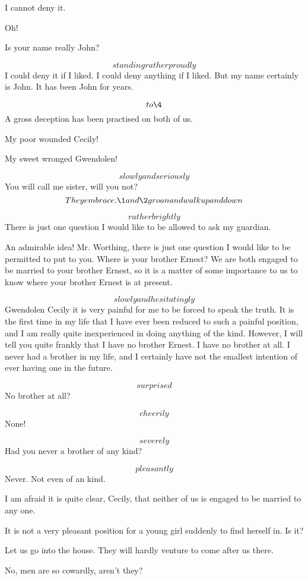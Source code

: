 \documentclass{book}
\begin{document}
\2  I cannot deny it.

\5  Oh!

\4  Is your name really John?

\1  \[standing rather proudly\]  I could deny it if I liked.  I
could deny anything if I liked.  But my name certainly is John.  It
has been John for years.

\5  \[to \4\]  A gross deception has been practised on
both of us.

\4  My poor wounded Cecily!

\5  My sweet wronged Gwendolen!

\4  \[slowly and seriously\]  You will call me sister, will
you not? \[They embrace.  \1 and \2 groan and walk up and down\]

\5  \[rather brightly\]  There is just one question I would
like to be allowed to ask my guardian.

\4  An admirable idea!  Mr. Worthing, there is just one
question I would like to be permitted to put to you.  Where is your
brother Ernest?  We are both engaged to be married to your brother
Ernest, so it is a matter of some importance to us to know where
your brother Ernest is at present.

\1  \[slowly and hesitatingly\]  Gwendolen \textemdash Cecily
\textemdash it is very
painful for me to be forced to speak the truth.  It is the first
time in my life that I have ever been reduced to such a painful
position, and I am really quite inexperienced in doing anything of
the kind.  However, I will tell you quite frankly that I have no
brother Ernest.  I have no brother at all.  I never had a brother
in my life, and I certainly have not the smallest intention of ever
having one in the future.

\5  \[surprised\]  No brother at all?

\1  \[cheerily\]  None!

\4  \[severely\]  Had you never a brother of any kind?

\1  \[pleasantly\]  Never.  Not even of an kind.

\4  I am afraid it is quite clear, Cecily, that neither of
us is engaged to be married to any one.

\5  It is not a very pleasant position for a young girl
suddenly to find herself in.  Is it?

\4  Let us go into the house.  They will hardly venture to
come after us there.

\5  No, men are so cowardly, aren't they?
\end{document}
